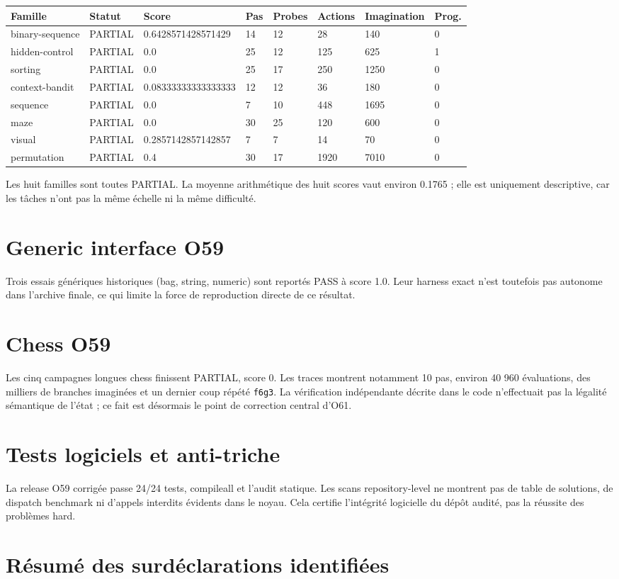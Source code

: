 \documentclass[11pt,a4paper]{article}
\begin{document}
\begin{longtable}{p{} p{} p{} p{} p{} p{} p{} p{}}
\toprule
Famille & Statut & Score & Pas & Probes & Actions & Imagination & Prog. \\
\midrule
\endhead
binary-sequence & PARTIAL & 0.6428571428571429 & 14 & 12 & 28 & 140 & 0 \\
hidden-control & PARTIAL & 0.0 & 25 & 12 & 125 & 625 & 1 \\
sorting & PARTIAL & 0.0 & 25 & 17 & 250 & 1250 & 0 \\
context-bandit & PARTIAL & 0.08333333333333333 & 12 & 12 & 36 & 180 & 0 \\
sequence & PARTIAL & 0.0 & 7 & 10 & 448 & 1695 & 0 \\
maze & PARTIAL & 0.0 & 30 & 25 & 120 & 600 & 0 \\
visual & PARTIAL & 0.2857142857142857 & 7 & 7 & 14 & 70 & 0 \\
permutation & PARTIAL & 0.4 & 30 & 17 & 1920 & 7010 & 0 \\
\bottomrule
\end{longtable}Les huit familles sont toutes PARTIAL. La moyenne arithmétique des huit scores vaut environ 0.1765 ; elle est uniquement descriptive, car les tâches n'ont pas la même échelle ni la même difficulté.\section{Generic interface O59}
Trois essais génériques historiques (bag, string, numeric) sont reportés PASS à score 1.0. Leur harness exact n'est toutefois pas autonome dans l'archive finale, ce qui limite la force de reproduction directe de ce résultat.\section{Chess O59}
Les cinq campagnes longues chess finissent PARTIAL, score 0. Les traces montrent notamment 10 pas, environ 40 960 évaluations, des milliers de branches imaginées et un dernier coup répété \texttt{f6g3}. La vérification indépendante décrite dans le code n'effectuait pas la légalité sémantique de l'état ; ce fait est désormais le point de correction central d'O61.\section{Tests logiciels et anti-triche}
La release O59 corrigée passe 24/24 tests, compileall et l'audit statique. Les scans repository-level ne montrent pas de table de solutions, de dispatch benchmark ni d'appels interdits évidents dans le noyau. Cela certifie l'intégrité logicielle du dépôt audité, pas la réussite des problèmes hard.\section{Résumé des surdéclarations identifiées}
\end{document}
